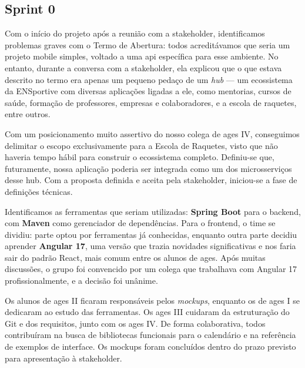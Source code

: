 \subsection{Sprint 0}

Com o início do projeto após a reunião com a stakeholder, identificamos problemas graves com
o Termo de Abertura: todos acreditávamos que seria um projeto mobile simples, voltado a uma
\ac{api} específica para esse ambiente. No entanto, durante a conversa com a stakeholder, ela
explicou que o que estava descrito no termo era apenas um pequeno pedaço de um \textit{hub}
--- um ecossistema da ENSportive com diversas aplicações ligadas a ele, como mentorias,
cursos de saúde, formação de professores, empresas e colaboradores, e a escola de raquetes,
entre outros.

Com um posicionamento muito assertivo do nosso colega de \ac{ages} IV, conseguimos delimitar o
escopo exclusivamente para a Escola de Raquetes, visto que não haveria tempo hábil para
construir o ecossistema completo. Definiu-se que, futuramente, nossa aplicação poderia ser
integrada como um dos microsserviços desse hub. Com a proposta definida e aceita pela
stakeholder, iniciou-se a fase de definições técnicas.

Identificamos as ferramentas que seriam utilizadas: \textbf{Spring Boot} para o backend,
com \textbf{Maven} como gerenciador de dependências. Para o frontend, o time se dividiu:
parte optou por ferramentas já conhecidas, enquanto outra parte decidiu aprender
\textbf{Angular 17}, uma versão que trazia novidades significativas e nos faria sair do
padrão React, mais comum entre os alunos de \ac{ages}. Após muitas discussões, o grupo foi
convencido por um colega que trabalhava com Angular 17 profissionalmente, e a decisão foi
unânime.

Os alunos de \ac{ages} II ficaram responsáveis pelos \textit{mockups}, enquanto os de \ac{ages} I
se dedicaram ao estudo das ferramentas. Os \ac{ages} III cuidaram da estruturação do Git e dos
requisitos, junto com os \ac{ages} IV. De forma colaborativa, todos contribuíram na busca de
bibliotecas funcionais para o calendário e na referência de exemplos de interface.
Os mockups foram concluídos dentro do prazo previsto para apresentação à stakeholder.